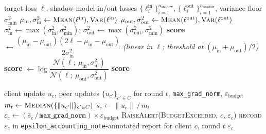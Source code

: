\begin{algorithm}[t]
\caption{LiRA per-round scoring with variance-floor collapse}
\label{alg:lira-score}
\begin{algorithmic}[1]
\REQUIRE target loss $\ell$, shadow-model in/out losses $\{\ell^{\text{in}}_i\}_{i=1}^{n_{\text{shadow}}}$, $\{\ell^{\text{out}}_i\}_{i=1}^{n_{\text{shadow}}}$, variance floor $\sigma^2_{\min}$
\STATE $\mu_{\text{in}}, \sigma^2_{\text{in}} \gets \textsc{Mean}(\ell^{\text{in}}), \textsc{Var}(\ell^{\text{in}})$
\STATE $\mu_{\text{out}}, \sigma^2_{\text{out}} \gets \textsc{Mean}(\ell^{\text{out}}), \textsc{Var}(\ell^{\text{out}})$
\STATE $\sigma^2_{\text{in}} \gets \max(\sigma^2_{\text{in}}, \sigma^2_{\min})$; \quad $\sigma^2_{\text{out}} \gets \max(\sigma^2_{\text{out}}, \sigma^2_{\min})$
  \STATE \textbf{score} $\gets \dfrac{(\mu_{\text{in}}-\mu_{\text{out}})(2\ell-\mu_{\text{in}}-\mu_{\text{out}})}{2\sigma_{\text{in}}^2}$ \textit{(linear in $\ell$; threshold at $(\mu_{\text{in}}+\mu_{\text{out}})/2$)}
\ELSE
  \STATE \textbf{score} $\gets \log\dfrac{\mathcal{N}(\ell;\ \mu_{\text{in}}, \sigma^2_{\text{in}})}{\mathcal{N}(\ell;\ \mu_{\text{out}}, \sigma^2_{\text{out}})}$ 
\ENDIF
\STATE \RETURN \textbf{score}
\end{algorithmic}
\end{algorithm}

\begin{algorithm}[t]
\caption{Privacy Auditor per-round budget score (not formal DP accounting)}
\label{alg:round-epsilon}
\begin{algorithmic}[1]
\REQUIRE client update $u_c$, peer updates $\{u_{c'}\}_{c' \in C}$ for round $t$, \texttt{max\_grad\_norm}, $\varepsilon_{\text{budget}}$
\STATE $m_t \gets \textsc{Median}(\{\lVert u_{c'} \rVert\}_{c' \in C})$ 
\STATE $\hat{s}_c \gets \lVert u_c \rVert \,/\, m_t$ 
\STATE $\varepsilon_c \gets (\hat{s}_c \,/\, \texttt{max\_grad\_norm}) \times \varepsilon_{\text{budget}}$
  \STATE \textsc{RaiseAlert}(\textsc{BudgetExceeded}, $c$, $\varepsilon_c$)
\ENDIF
\STATE \textsc{record} $\varepsilon_c$ in \texttt{epsilon\_accounting\_note}-annotated report for client $c$, round $t$
\STATE \RETURN $\varepsilon_c$
\end{algorithmic}
\end{algorithm}